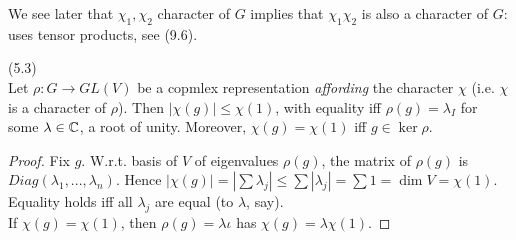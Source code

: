 \documentclass[a4paper]{article}
\begin{document}
\begin{rem}
We see later that $\chi_1,\chi_2$ character of $G$ implies that $\chi_1\chi_2$ is also a character of $G$: uses tensor products, see (9.6).
\end{rem}

\begin{lemma} (5.3)\\
Let $\rho:G \to GL(V)$ be a copmlex representation \emph{affording} the character $\chi$ (i.e. $\chi$ is a character of $\rho$). Then $|\chi(g)| \leq \chi(1)$, with equality iff $\rho(g) = \lambda_I$ for some $\lambda \in \mathbb{C}$, a root of unity. Moreover, $\chi(g) = \chi(1)$ iff $g \in \ker \rho$.
\begin{proof}
Fix $g$. W.r.t. basis of $V$ of eigenvalues $\rho(g)$, the matrix of $\rho(g)$ is $Diag(\lambda_1,...,\lambda_n)$. Hence $|\chi(g)| = |\sum \lambda_j| \leq \sum |\lambda_j|= \sum 1 = \dim V = \chi(1)$. Equality holds iff all $\lambda_j$ are equal (to $\lambda$, say).\\
If $\chi(g) = \chi(1)$, then $\rho(g) = \lambda \iota$ has $\chi(g) = \lambda \chi(1)$.
\end{proof}
\end{lemma}

\end{document}
